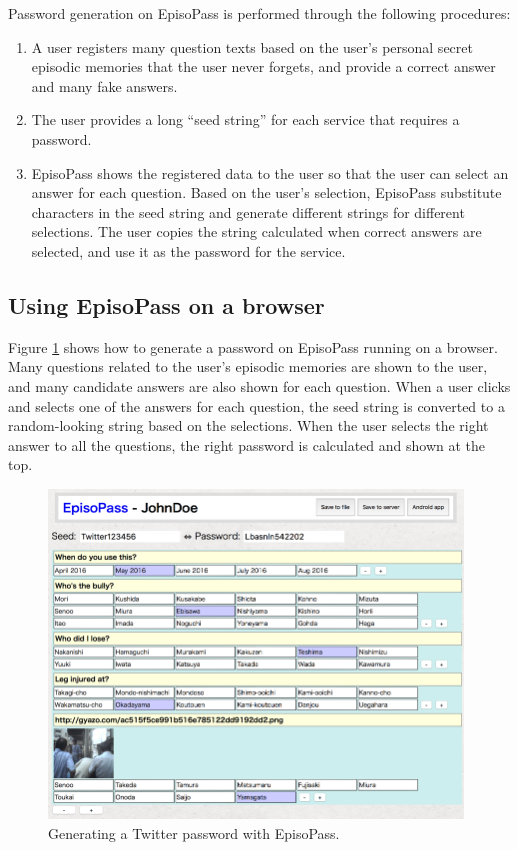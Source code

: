 \documentclass{article}
\begin{document}
Password generation on EpisoPass is performed through the following procedures:

\begin{enumerate}
\item A user registers many question texts based on the user's personal
secret episodic memories that the user never forgets,
and provide a correct answer and many fake answers.

\item The user provides a long ``seed string'' for each service that requires
a password.

\item EpisoPass shows the registered data to the user so that
the user can select an answer for each question.
Based on the user's selection,
EpisoPass substitute characters in the seed string and generate different
strings for different selections.
The user copies the string calculated when correct answers are selected,
and use it as the password for the service.
\end{enumerate}

\subsection{Using EpisoPass on a browser}

Figure \ref{web1} shows how to generate a password
on EpisoPass running on a browser.
Many questions related to the user's episodic memories are shown to the user,
and many candidate answers are also shown for each question.
When a user clicks and selects one of the answers for each question,
the seed string is converted to a random-looking string
based on the selections.
When the user selects the right answer to all the questions,
the right password is calculated and shown at the top.


\begin{figure}[H]
\includegraphics[width=110mm,bb=-30 0 803 662]{figures/c1bd6e7f67698c70978f528ccd2339d9.png}
\caption{Generating a Twitter password with EpisoPass.}
\label{web1}
\end{figure}
\end{document}
